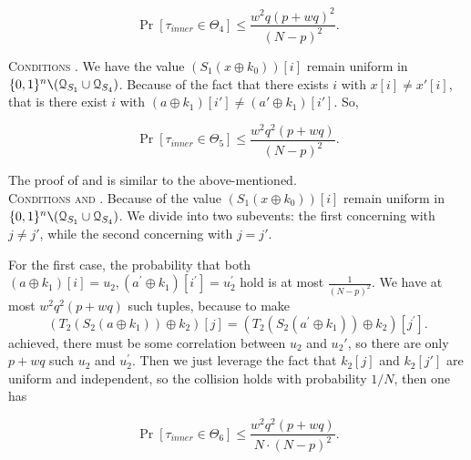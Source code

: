$$
\operatorname{Pr}\left[\tau_{inner} \in \Theta_{4}\right] \leq \frac{w^{2} q (p+w q)^{2}}{(N-p)^2}.
$$

\noindent \textsc{Conditions \cfive}. We have the value $\left(S_{1}\left(x \oplus k_{0}\right)\right)[i]$ remain uniform in $\{0, 1\}^{n} \verb|\| (\mathcal{Q}_{S_{1}} \cup \mathcal{Q}_{S_{4}})$.  Because of the fact that there exists $i$ with $x[i]\neq x'[i]$, that is there exist $i$ with $\left(a \oplus k_{1}\right)[i'] \neq \left(a' \oplus k_{1}\right)[i']$. So,

$$
\operatorname{Pr}\left[\tau_{inner} \in \Theta_{5}\right] \leq \frac{w^{2} q^{2} (p+w q)}{(N-p)^2}.
$$

\noindent The proof of \cseven and \ceight is similar to the above-mentioned.\\

\noindent \textsc{Conditions \csix and \cnine}. Because of the value $\left(S_{1}\left(x \oplus k_{0}\right)\right)[i]$ remain uniform in $\{0, 1\}^{n} \verb|\| (\mathcal{Q}_{S_{1}} \cup \mathcal{Q}_{S_{4}})$. We divide \csix into two subevents: the first concerning with $j\neq j'$, while the second concerning with $j=j'$.

For the first case, the probability that both $\left(a \oplus k_{1}\right)[i] = u_2, \left(a^{\prime} \oplus k_{1}\right)[i^{\prime}] = u_2^{\prime}$ hold is at most $\frac{1}{(N-p)^2}$. We have at most $w^{2} q^{2} (p+w q)$ such tuples, because to make 
$$
\left(T_{2}\left(S_{2}\left(a \oplus k_{1}\right)\right) \oplus k_{2}\right)[j] = \left(T_{2}\left(S_{2}\left(a^{\prime} \oplus k_{1}\right)\right) \oplus k_{2}\right)[j^{\prime}].
$$
\noindent achieved, there must be some correlation between $u_2$ and $u_2'$, so there are only $p +w q $ such $u_2$ and $u_2^{\prime}$.  Then we just leverage the fact that $k_2[j]$ and $k_2[j']$ are uniform and independent, so the collision holds with probability $1/N$, then one has

$$
\operatorname{Pr}\left[\tau_{inner} \in \Theta_{6}\right] \leq \frac{w^{2} q^{2} (p+w q)}{N \cdot (N-p)^2 }.
$$

